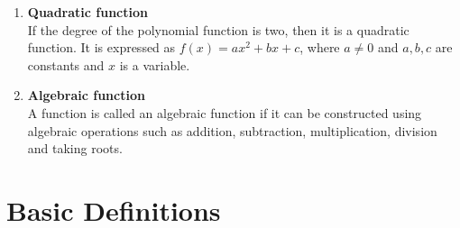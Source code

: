 \documentclass[11pt]{report}
\newcommand{\bt}[1]{\textbf{#1}}
\begin{document}
\begin{enumerate}
		\item\bt{Quadratic function}\\
		If the degree of the polynomial function is two, then it is a quadratic function. It is expressed as $f(x)=ax^2 + bx + c$, where $a\neq 0$ and $a,b,c$ are constants and $x$ is a variable.
		
		\item\bt{Algebraic function}\\
		A function is called an algebraic function if it can be constructed using algebraic operations such as addition, subtraction, multiplication, division and taking roots.
	\end{enumerate}
	
	\section{Basic Definitions}
\end{document}
